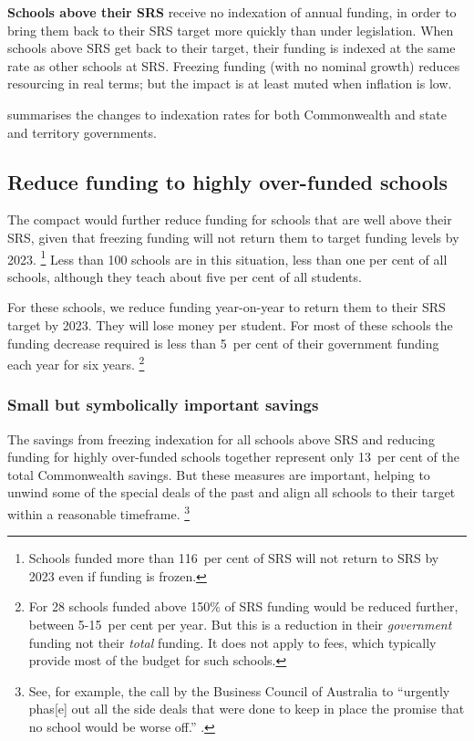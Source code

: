 \documentclass{grattan}
\begin{document}
\textbf{Schools above their SRS} receive no indexation of annual funding, in order to bring them back to their SRS target more quickly than under legislation.
When schools above SRS get back to their target, their funding is indexed at the same rate as other schools at SRS\@.
Freezing funding (with no nominal growth) reduces resourcing in real terms; but the impact is at least muted when inflation is low.

 summarises the changes to indexation rates for both Commonwealth and state and territory governments.

\subsection{Reduce funding to highly over-funded schools}\label{subsec:iii-reduce-funding-to-highly-over-funded-schools}

The compact would further reduce funding for schools that are well above their SRS, given that freezing funding will not return them to target funding levels by 2023.%
\footnote{Schools funded more than 116~per cent of SRS will not return to SRS by 2023 even if funding is frozen.}
Less than 100 schools are in this situation, less than one per cent of all schools, although they teach about five per cent of all students.

For these schools, we reduce funding year-on-year to return them to their SRS target by 2023.
They will lose money per student.
For most of these schools the funding decrease required is less than 5~per cent of their government funding each year for six years.%
\footnote{For 28 schools funded above 150\% of SRS funding would be reduced further, between 5-15~per cent per year. But this is a reduction in their \emph{government} funding not their \emph{total} funding. It does not apply to fees, which typically provide most of the budget for such schools.}

\subsubsection{Small but symbolically important savings }\label{subsubsec:small-but-symbolically-important-savings}

The savings from freezing indexation for all schools above SRS and reducing funding for highly over-funded schools together represent only 13~per cent of the total Commonwealth savings.
But these measures are important, helping to unwind some of the special deals of the past and align all schools to their target within a reasonable timeframe.%
\footnote{See, for example, the call by the Business Council of Australia to ``urgently phas[e] out all the side deals that were done to keep in place the promise that no school would be worse off.'' \textcite{Westacott2016FutureEducation}.}
\end{document}
